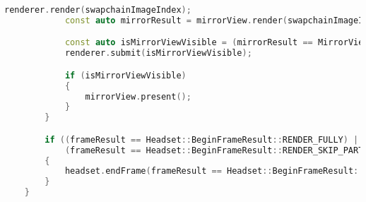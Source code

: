 \begin{lstlisting}[language=c++, caption=Engine main loop (./engine/src/core/core.cpp)]
            renderer.render(swapchainImageIndex);
            const auto mirrorResult = mirrorView.render(swapchainImageIndex);

            const auto isMirrorViewVisible = (mirrorResult == MirrorView::RenderResult::VISIBLE);
            renderer.submit(isMirrorViewVisible);

            if (isMirrorViewVisible)
            {
                mirrorView.present();
            }
        }

        if ((frameResult == Headset::BeginFrameResult::RENDER_FULLY) ||
            (frameResult == Headset::BeginFrameResult::RENDER_SKIP_PARTIALLY))
        {
            headset.endFrame(frameResult == Headset::BeginFrameResult::RENDER_SKIP_PARTIALLY);
        }
    }
\end{lstlisting}

\newpage

